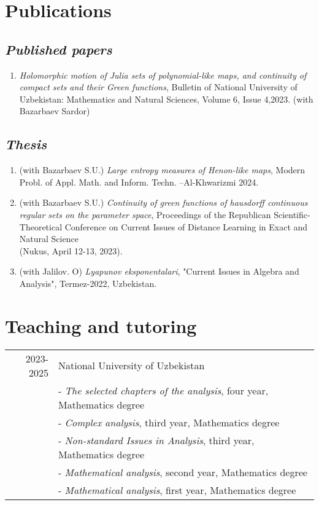 \documentclass[a4paper,10pt]{article}
\begin{document}
\section{Publications}
\subsection*{\it{Published papers}}
\begin{enumerate}
\item \emph{Holomorphic motion of Julia sets of polynomial-like maps, and continuity of compact sets and their Green functions}, Bulletin of National University of Uzbekistan: Mathematics and Natural Sciences, Volume 6, Issue 4,2023. (with Bazarbaev Sardor)
\end{enumerate}
\subsection*{\it{Thesis}}
\begin{enumerate}

\item (with Bazarbaev S.U.) \emph{Large entropy measures of Henon-like
maps}, Modern Probl. of Appl. Math. and Inform. Techn. –Al-Khwarizmi 2024.
\item (with Bazarbaev S.U.) \emph{Continuity of green functions of
hausdorff continuous regular sets on the parameter space}, Proceedings of the Republican Scientific-Theoretical Conference on Current Issues of Distance Learning in Exact and Natural Science\\  (Nukus, April 12-13, 2023).
\item (with Jalilov. O) \emph{Lyapunov eksponentalari},  "Current Issues in Algebra and Analysis", Termez-2022, Uzbekistan.
\end{enumerate}
\section{Teaching and tutoring }
\begin{tabular}{r|p{11cm}}
2023-2025 & National University of Uzbekistan\\ 
& - \emph{The selected chapters of the analysis}, four year, Mathematics  degree
\\
& - \emph{Complex analysis}, third year, Mathematics degree\\
& - \emph{Non-standard Issues in Analysis}, third year, Mathematics degree
\\ & - \emph{Mathematical analysis}, second year, Mathematics  degree
\\ & - \emph{Mathematical analysis}, first year, Mathematics  degree
\end{tabular}
\end{document}
